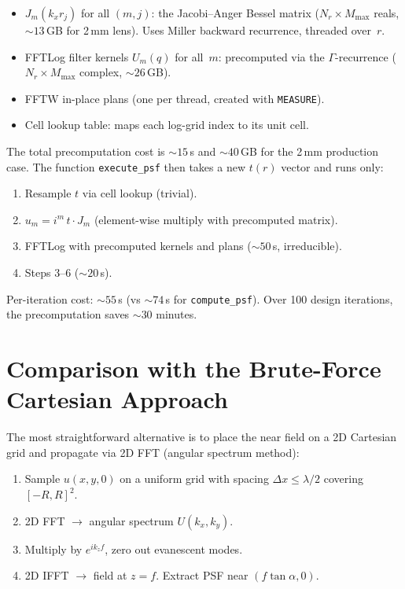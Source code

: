 \documentclass[11pt,a4paper]{article}
\begin{document}
\begin{itemize}[nosep]
  \item $J_m(k_x r_j)$ for all $(m,j)$: the Jacobi--Anger Bessel matrix
        ($N_r \times M_{\max}$ reals, ${\sim}13$\,GB for 2\,mm lens).
        Uses Miller backward recurrence, threaded over~$r$.
  \item FFTLog filter kernels $U_m(q)$ for all~$m$: precomputed via the
        $\Gamma$-recurrence ($N_r \times M_{\max}$ complex, ${\sim}26$\,GB).
  \item FFTW in-place plans (one per thread, created with \texttt{MEASURE}).
  \item Cell lookup table: maps each log-grid index to its unit cell.
\end{itemize}
The total precomputation cost is ${\sim}15$\,s and ${\sim}40$\,GB for the
2\,mm production case.  The function \texttt{execute\_psf} then takes a new
$t(r)$ vector and runs only:
\begin{enumerate}[nosep]
  \item Resample $t$ via cell lookup (trivial).
  \item $u_m = i^m\,t \cdot J_m$ (element-wise multiply with precomputed matrix).
  \item FFTLog with precomputed kernels and plans (${\sim}50$\,s, irreducible).
  \item Steps 3--6 (${\sim}20$\,s).
\end{enumerate}
Per-iteration cost: ${\sim}55$\,s (vs ${\sim}74$\,s for \texttt{compute\_psf}).
Over 100 design iterations, the precomputation saves ${\sim}30$ minutes.


\section{Comparison with the Brute-Force Cartesian Approach}
\label{sec:cartesian}

The most straightforward alternative is to place the near field on a 2D Cartesian
grid and propagate via 2D FFT (angular spectrum method):
\begin{enumerate}[nosep]
  \item Sample $u(x,y,0)$ on a uniform grid with spacing $\Delta x \le \lambda/2$
        covering $[-R, R]^2$.
  \item 2D FFT $\to$ angular spectrum $U(k_x, k_y)$.
  \item Multiply by $e^{ik_z f}$, zero out evanescent modes.
  \item 2D IFFT $\to$ field at $z = f$.  Extract PSF near $(f\tan\alpha, 0)$.
\end{enumerate}
\end{document}
